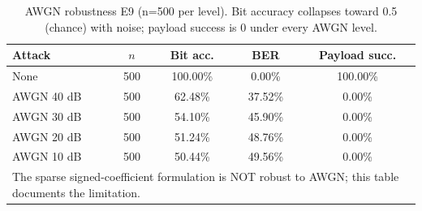 \begin{table}[t]
\centering
\caption{AWGN robustness E9 (n=500 per level). Bit accuracy collapses toward 0.5 (chance) with noise; payload success is 0 under every AWGN level.}
\label{tab:awgn-e9}
\scriptsize
\begin{tabular}{lcccc}
\toprule
\textbf{Attack} & \textbf{$n$} & \textbf{Bit acc.} & \textbf{BER} & \textbf{Payload succ.} \\
\midrule
None & 500 & 100.00\% & 0.00\% & 100.00\% \\
AWGN 40 dB & 500 & 62.48\% & 37.52\% & 0.00\% \\
AWGN 30 dB & 500 & 54.10\% & 45.90\% & 0.00\% \\
AWGN 20 dB & 500 & 51.24\% & 48.76\% & 0.00\% \\
AWGN 10 dB & 500 & 50.44\% & 49.56\% & 0.00\% \\
\bottomrule
\multicolumn{5}{l}{\footnotesize The sparse signed-coefficient formulation is NOT robust to AWGN; this table documents the limitation.}\\
\end{tabular}
\end{table}
